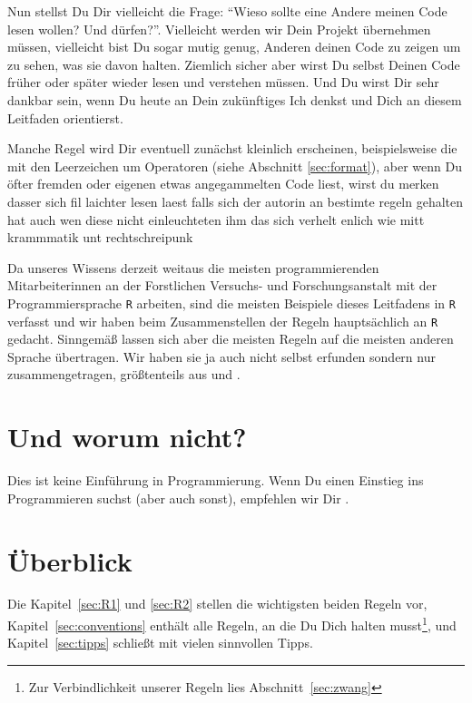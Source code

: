 \documentclass[twoside]{scrreprt}
\providecommand{\R}{\texttt{R}}
\providecommand{\FVA}[1]{Forstliche#1 Versuchs- und Forschungsanstalt}
\begin{document}
Nun stellst Du Dir vielleicht die Frage: "`Wieso sollte eine Andere meinen Code
lesen wollen? Und d\"u{}rfen?"'. Vielleicht werden wir Dein Projekt
\"u{}bernehmen m\"u{}ssen, vielleicht bist Du sogar mutig genug, Anderen
deinen Code zu zeigen um zu sehen, was sie davon halten.
Ziemlich sicher aber wirst
Du selbst Deinen Code fr\"u{}her oder sp\"a{}ter wieder lesen und verstehen
m\"u{}ssen. Und Du wirst Dir sehr dankbar sein, wenn Du heute an Dein
zuk\"u{}nftiges Ich denkst und Dich an diesem Leitfaden orientierst.

Manche Regel wird Dir eventuell zun\"a{}chst kleinlich erscheinen,
beispielsweise die mit den Leerzeichen  um  Operatoren (siehe Abschnitt
\ref{sec:format}), aber wenn Du \"o{}fter fremden oder eigenen etwas
angegammelten Code liest, wirst
du merken dasser sich fil laichter lesen laest falls sich der autorin an
bestimte regeln gehalten hat auch wen diese nicht einleuchteten ihm das
sich verhelt enlich wie mitt krammmatik unt rechtschreipunk

Da unseres Wissens derzeit weitaus die meisten programmierenden Mitarbeiterinnen
an der \FVA{n} mit der Programmiersprache \R{} arbeiten, sind die
meisten Beispiele dieses Leitfadens in \R{} verfasst und wir haben beim
Zusammenstellen der Regeln haupts\"a{}chlich an \R{} gedacht.
Sinngem\"a{}\ss{} lassen sich aber die meisten Regeln auf die meisten
anderen Sprache \"u{}bertragen. Wir haben sie ja auch nicht selbst erfunden
sondern nur zusammengetragen, gr\"o{}\ss{}tenteils aus \cite{cc} und \cite{wsp}.

\section{Und worum nicht?} Dies ist keine Einf\"u{}hrung in Programmierung.
Wenn Du einen Einstieg ins Programmieren suchst (aber auch sonst), empfehlen wir
Dir \cite{headfirst}.
\section{\"U{}berblick}
Die Kapitel~\ref{sec:R1} und \ref{sec:R2} stellen die wichtigsten beiden Regeln
vor, Kapitel~\ref{sec:conventions} enth\"a{}lt alle Regeln, an die Du Dich
halten musst\footnote{
  Zur Verbindlichkeit unserer Regeln lies Abschnitt~\ref{sec:zwang}
}, und Kapitel~\ref{sec:tipps} schlie\ss{}t mit vielen sinnvollen Tipps.
\end{document}
